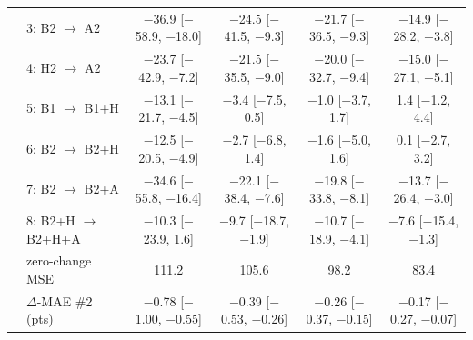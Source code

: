 \documentclass{article}
\newcommand{\cto}{$\rightarrow$}
\begin{document}
\begin{table}[h]
{\begin{tabular}{llcccc}
 & 3: B2 \cto{} A2 & $-$36.9 [$-$58.9, $-$18.0] & $-$24.5 [$-$41.5, $-$9.3] & $-$21.7 [$-$36.5, $-$9.3] & $-$14.9 [$-$28.2, $-$3.8] \\
 & 4: H2 \cto{} A2 & $-$23.7 [$-$42.9, $-$7.2] & $-$21.5 [$-$35.5, $-$9.0] & $-$20.0 [$-$32.7, $-$9.4] & $-$15.0 [$-$27.1, $-$5.1] \\
 & 5: B1 \cto{} B1+H & $-$13.1 [$-$21.7, $-$4.5] & $-$3.4 [$-$7.5, 0.5] & $-$1.0 [$-$3.7, 1.7] & 1.4 [$-$1.2, 4.4] \\
 & 6: B2 \cto{} B2+H & $-$12.5 [$-$20.5, $-$4.9] & $-$2.7 [$-$6.8, 1.4] & $-$1.6 [$-$5.0, 1.6] & 0.1 [$-$2.7, 3.2] \\
 & 7: B2 \cto{} B2+A & $-$34.6 [$-$55.8, $-$16.4] & $-$22.1 [$-$38.4, $-$7.6] & $-$19.8 [$-$33.8, $-$8.1] & $-$13.7 [$-$26.4, $-$3.0] \\
 & 8: B2+H \cto{} B2+H+A & $-$10.3 [$-$23.9, 1.6] & $-$9.7 [$-$18.7, $-$1.9] & $-$10.7 [$-$18.9, $-$4.1] & $-$7.6 [$-$15.4, $-$1.3] \\
 & zero-change MSE & 111.2 & 105.6 & 98.2 & 83.4 \\
 & $\Delta$-MAE \#2 (pts) & $-$0.78 [$-$1.00, $-$0.55] & $-$0.39 [$-$0.53, $-$0.26] & $-$0.26 [$-$0.37, $-$0.15] & $-$0.17 [$-$0.27, $-$0.07] \\
\bottomrule
\end{tabular}
}
\end{table}
\end{document}
